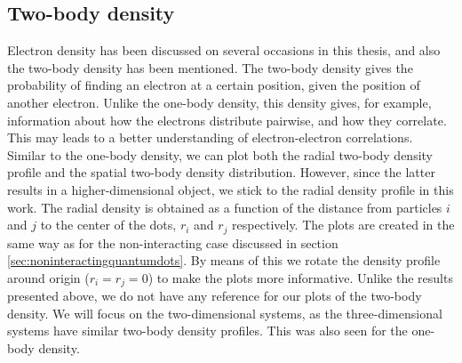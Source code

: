\subsection{Two-body density}
Electron density has been discussed on several occasions in this thesis, and also the two-body density has been mentioned. The two-body density gives the probability of finding an electron at a certain position, given the position of another electron. Unlike the one-body density, this density gives, for example, information about how the electrons distribute pairwise, and how they correlate. This may leads to a better understanding of electron-electron correlations. Similar to the one-body density, we can plot both the radial two-body density profile and the spatial two-body density distribution. However, since the latter results in a higher-dimensional object, we stick to the radial density profile in this work. The radial density is obtained as a function of the distance from particles $i$ and $j$ to the center of the dots, $r_i$ and $r_j$ respectively. The plots are created in the same way as for the non-interacting case discussed in section \ref{sec:noninteractingquantumdots}. By means of this we rotate the density profile around origin ($r_i=r_j=0$) to make the plots more informative. Unlike the results presented above, we do not have any reference for our plots of the two-body density. We will focus on the two-dimensional systems, as the three-dimensional systems have similar two-body density profiles. This was also seen for the one-body density.

